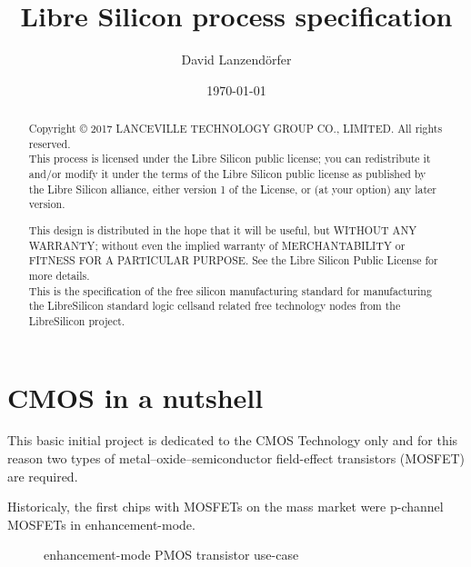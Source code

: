 \documentclass[10pt,a4paper,oneside]{article}
\title{Libre Silicon process specification}
\date{\today}
\author{David Lanzendörfer}
\begin{document}
\maketitle

\begin{abstract}
	Copyright © 2017 LANCEVILLE TECHNOLOGY GROUP CO., LIMITED. All rights reserved. \\

	This process is licensed under the Libre Silicon public license; you can redistribute it and/or modify it under the terms of the Libre Silicon public license
	as published by the Libre Silicon alliance, either version 1 of the License, or (at your option) any later version.

	This design is distributed in the hope that it will be useful, but WITHOUT ANY WARRANTY; without even the implied warranty of MERCHANTABILITY or FITNESS FOR A PARTICULAR PURPOSE.
	See the Libre Silicon Public License for more details. \\

	This is the specification of the free silicon manufacturing standard for manufacturing the LibreSilicon standard logic cells\footnotemark and related free technology nodes from the LibreSilicon project.
\end{abstract}
\newpage
\tableofcontents
\newpage

\section{CMOS in a nutshell}

This basic initial project is dedicated to the CMOS Technology only and for this reason two types of metal–oxide–semiconductor field-effect transistors (MOSFET) are required.

Historicaly, the first chips with MOSFETs on the mass market were p-channel MOSFETs in enhancement-mode.

\begin{center}
	\begin{figure}[h]
		\begin{center}
			\begin{circuitdiagram}{20}{20}
			\end{circuitdiagram}
		\end{center}
		\caption{enhancement-mode PMOS transistor use-case}
	\end{figure}
\end{center}
\end{document}
